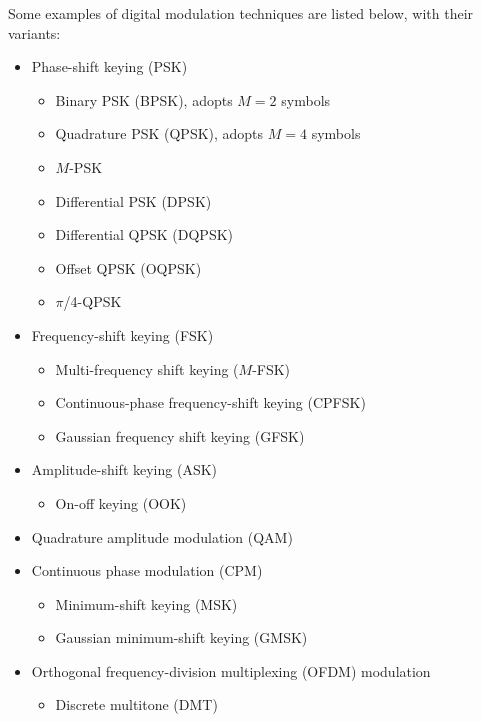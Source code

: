 Some examples of digital modulation techniques are listed below, with their variants:
\begin{itemize}
\item Phase-shift keying (PSK)
	\begin{itemize}
	\item Binary PSK (BPSK), adopts $M=2$ symbols
	\item Quadrature PSK (QPSK), adopts $M=4$ symbols
	\item $M$-PSK
	\item Differential PSK (DPSK)
	\item Differential QPSK (DQPSK)
	\item Offset QPSK (OQPSK)
	\item $\pi$/4-QPSK
  \end{itemize}    
\item Frequency-shift keying (FSK)
	\begin{itemize}
 	\item Multi-frequency shift keying ($M$-FSK)
	\item Continuous-phase frequency-shift keying (CPFSK)
	\item Gaussian frequency shift keying (GFSK)
	\end{itemize}  
\item Amplitude-shift keying (ASK)
    \begin{itemize}        
    \item On-off keying (OOK)
		\end{itemize}    
\item Quadrature amplitude modulation (QAM)
\item Continuous phase modulation (CPM) 
	\begin{itemize}
  \item Minimum-shift keying (MSK)
  \item Gaussian minimum-shift keying (GMSK)
	\end{itemize}
\item Orthogonal frequency-division multiplexing (OFDM) modulation
	\begin{itemize}        
  \item Discrete multitone (DMT)
	\end{itemize}
\end{itemize}

